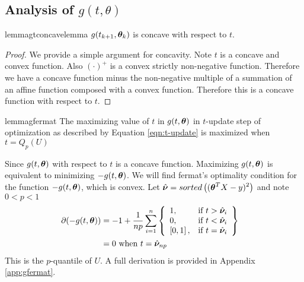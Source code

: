 \documentclass{article} %
\begin{document}
	\subsection{Analysis of $g(t,\theta)$}
		
	\begin{restatable}{lemma}{gtconcavelemma}
		\label{lem:gtcomcavelemma}
		$g(t_{k+1},{\bm{\theta}}_k)$ is concave with respect to $t$.
	\end{restatable}
	\begin{proof}
		We provide a simple argument for concavity. Note $t$ is a concave and convex function. Also $(\cdot)^+$ is a convex strictly non-negative function. Therefore we have a concave function minus the non-negative multiple of a summation of an affine function composed with a convex function. Therefore this is a concave function with respect to $t$. 
	\end{proof}	
	
	\begin{restatable}{lemma}{gfermat}
		\label{lem:gfermat}
		The maximizing value of $t$ in $g(t,{\bm{\theta}})$ in $t$-update step of optimization as described by Equation \ref{eqn:t-update} is maximized when $t = Q_p(U)$
	\end{restatable}
		Since $\displaystyle g(t,{\bm{\theta}})$ with respect to $t$ is a concave function. Maximizing $g(t,{\bm{\theta}})$ is equivalent to minimizing $-g(t,{\bm{\theta}})$. We will find fermat's optimality condition for the function $\displaystyle -g(t,{\bm{\theta}})$, which is convex. 
		Let $\displaystyle \hat{{\bm{\nu}}} = sorted\left(({\bm{\theta}}^T X - y)^2\right)$ and note $\displaystyle 0 < p < 1$
		\begin{align}
			\partial{\displaystyle (-g(t,\boldsymbol{\theta}})) 
			&= -1 + \frac{1}{np}\sum_{i=1}^{n}
			\left\{
			\begin{array}{lr}
				1, & \text{if } t > \hat{{\bm{\nu}}}_i\\
				0, & \text{if } t < \hat{{\bm{\nu}}}_i \\
				\left[0,1\right], & \text{if } t = \hat{{\bm{\nu}}}_i \\
			\end{array}
			\right\}&&\\
			&= 0 \text{ when }\displaystyle t = \hat{{\bm{\nu}}}_{np}&&
		\end{align}
		This is the $p$-quantile of $U$. A full derivation is provided in Appendix \ref{app:gfermat}.
	
\end{document}
